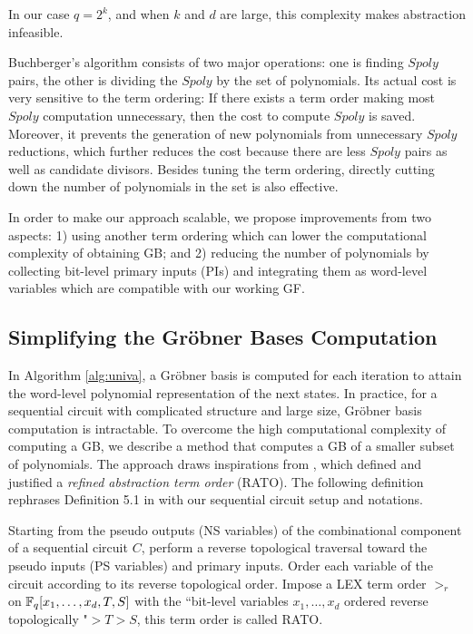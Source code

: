 In our case $q = 2^k$, and when $k$ and $d$ are large, this complexity 
makes abstraction infeasible.

Buchberger's algorithm consists of two major operations: one is finding 
$Spoly$ pairs, the other is dividing the $Spoly$ by the set of polynomials.
Its actual cost is very sensitive to the term ordering: If there exists 
a term order making most $Spoly$ computation unnecessary, then the cost to 
compute $Spoly$ is saved. Moreover, it prevents the generation of new polynomials 
from unnecessary $Spoly$ reductions, which further reduces the cost
because there are less $Spoly$ pairs as well as candidate divisors.
Besides tuning the term ordering, directly cutting down the number of 
polynomials in the set is also effective.

In order to make our approach scalable, we propose improvements from 
two aspects: 1) using another term ordering which can lower the 
computational complexity of obtaining GB; and 2) reducing the number of
polynomials by collecting bit-level primary inputs (PIs) and integrating them as word-level 
variables which are compatible with our working GF.

\subsection{Simplifying the Gr\"obner Bases Computation}
In Algorithm \ref{alg:univa}, a Gr\"obner basis is computed for each
iteration to attain the word-level polynomial representation of the next states. In practice, for 
a sequential circuit with complicated structure and large size, Gr\"obner basis computation
is intractable. To overcome the high computational complexity of computing a GB, 
we describe a method that computes a GB of a smaller subset of polynomials.
The approach draws inspirations from \cite{pruss:tcad15}, which defined and justified a 
{\it refined abstraction term order} (RATO). The following definition rephrases Definition 5.1 in \cite{pruss:tcad15}
with our sequential circuit setup and notations.

\begin{Definition}
Starting from the pseudo outputs (NS variables) of the combinational component of a sequential circuit $C$, 
perform a reverse topological 
traversal toward the pseudo inputs (PS variables) and primary inputs. Order each variable of the circuit according to
its reverse topological order. Impose a LEX term order $>_r$ on ${\mathbb{F}}_{q}[x_1,\dots,x_d,T,S]$
with the ``bit-level variables $x_1,\dots,x_d$ ordered reverse topologically "$ > T>S$,
this term order is called RATO.
\end{Definition}


